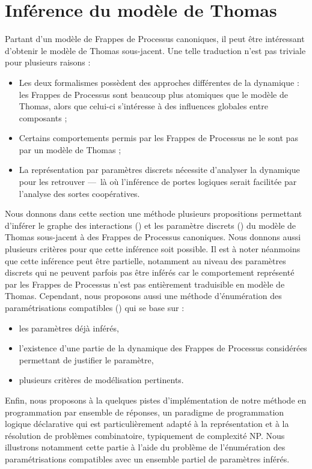 
\section{Inférence du modèle de Thomas}

Partant d'un modèle de Frappes de Processus canoniques, il peut être intéressant
d'obtenir le modèle de Thomas sous-jacent.
Une telle traduction n'est pas triviale pour plusieurs raisons :
\begin{itemize}
  \item Les deux formalismes possèdent des approches différentes de la dynamique :
    les Frappes de Processus sont beaucoup plus atomiques que le modèle de Thomas,
    alors que celui-ci s'intéresse à des influences globales entre composants ;
  \item Certains comportements permis par les Frappes de Processus ne le sont
    pas par un modèle de Thomas ;
  \item La représentation par paramètres discrets nécessite d'analyser la dynamique
    pour les retrouver ---~là où l'inférence de portes logiques serait facilitée
    par l'analyse des sortes coopératives.
\end{itemize}

Nous donnons dans cette section une méthode plusieurs propositions
permettant d'inférer le graphe des interactions ()
et les paramètre discrets ()
du modèle de Thomas sous-jacent à des Frappes de Processus canoniques.
Nous donnons aussi plusieurs critères pour que cette inférence soit possible.
Il est à noter néanmoins que cette inférence peut être partielle,
notamment au niveau des paramètres discrets qui ne peuvent parfois pas être inférés
car le comportement représenté par les Frappes de Processus n'est pas entièrement traduisible
en modèle de Thomas.
Cependant, nous proposons aussi une méthode d'énumération des paramétrisations compatibles
() qui se base sur :
\begin{itemize}
  \item les paramètres déjà inférés,
  \item l'existence d'une partie de la dynamique des Frappes de Processus considérées
    permettant de justifier le paramètre,
  \item plusieurs critères de modélisation pertinents.
\end{itemize}

Enfin, nous proposons à la  quelques pistes d'implémentation
de notre méthode en programmation par ensemble de réponses,
un paradigme de programmation logique déclarative qui est particulièrement
adapté à la représentation et à la résolution de problèmes combinatoire,
typiquement de complexité NP.
Nous illustrons notamment cette partie à l'aide du problème de l'énumération des paramétrisations
compatibles avec un ensemble partiel de paramètres inférés.

